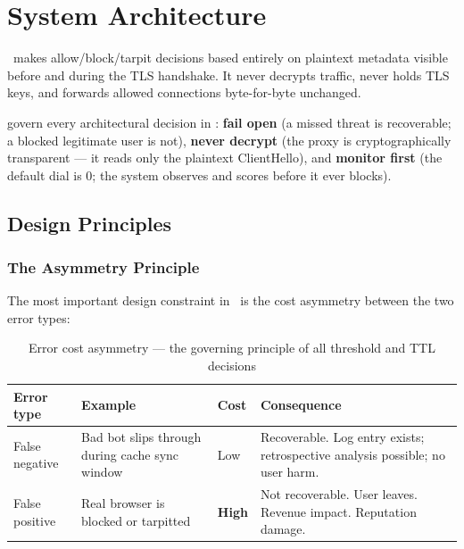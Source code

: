 
\chapter{System Architecture}
\label{ch:architecture}

\begin{chapterquote}
\ja\ makes allow/block/tarpit decisions based entirely on plaintext metadata visible
before and during the TLS handshake. It never decrypts traffic, never holds TLS keys,
and forwards allowed connections byte-for-byte unchanged.
\end{chapterquote}

 govern every architectural decision in \ja:
\textbf{fail open} (a missed threat is recoverable; a blocked legitimate user is not),
\textbf{never decrypt} (the proxy is cryptographically transparent — it reads only the
plaintext ClientHello), and \textbf{monitor first} (the default dial is 0; the system
observes and scores before it ever blocks).

\section{Design Principles}

\subsection{The Asymmetry Principle}

The most important design constraint in \ja\ is the cost asymmetry between the two
error types:

\begin{fullwidth}
\begin{table}[h]
\caption{Error cost asymmetry — the governing principle of all threshold and TTL decisions}
\label{tab:asymmetry}
\begin{tabular}{@{}lllp{7cm}@{}}
\toprule
\textbf{Error type} & \textbf{Example} & \textbf{Cost} & \textbf{Consequence} \\
\midrule
False negative & Bad bot slips through during cache sync window & \textcolor{ja4green}{Low} & Recoverable. Log entry exists; retrospective analysis possible; no user harm. \\
\addlinespace
False positive & Real browser is blocked or tarpitted & \textcolor{ja4red}{\textbf{High}} & Not recoverable. User leaves. Revenue impact. Reputation damage. \\
\bottomrule
\end{tabular}
\end{table}
\end{fullwidth}

